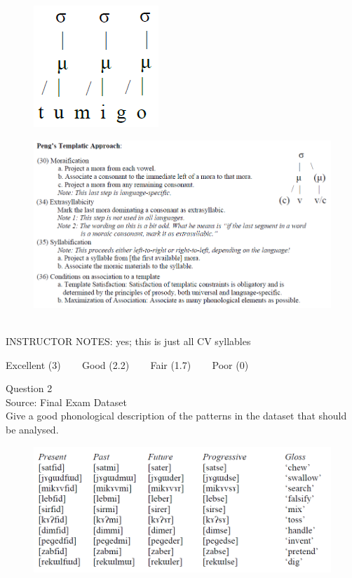 \documentclass[12pt]{article}
\begin{document}
\begin{figure}[H]
\includegraphics{../images/pengtemplate_tumigo_yes.png}
\end{figure}
\begin{figure}[H]
\includegraphics{../images/peng_template_withdiagram.png}
\end{figure}

~\\
INSTRUCTOR NOTES: yes; this is just all CV syllables


\vfill
Excellent (3) ~~~ Good (2.2) ~~~ Fair (1.7) ~~~ Poor (0)
\newpage

{\large Question 2}\\

Source: Final Exam Dataset\\

Give a good phonological description of the patterns in the dataset that should be analysed.\\

\begin{figure}[H]
\includegraphics{../images/final_dataset.png}
\end{figure}
\end{document}
